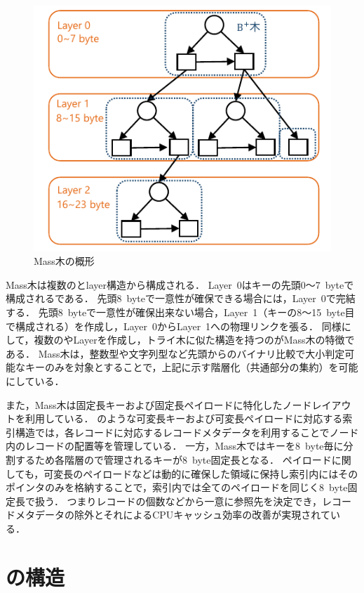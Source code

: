 \begin{figure}[t]
    \centering
    \includegraphics{./figures/masstree.pdf}
    \caption{Mass木の概形}
    \label{fig:masstree}
\end{figure}

Mass木は複数の\Bptree{}とlayer構造から構成される．
Layer~0はキーの先頭0～7~byteで構成される\Bptree{}である．
先頭8~byteで一意性が確保できる場合には，Layer~0で完結する．
先頭8~byteで一意性が確保出来ない場合，Layer~1（キーの8～15~byte目で構成される\Bptree{}）を作成し，Layer~0からLayer~1への物理リンクを張る．
同様にして，複数の\Bptree{}やLayerを作成し，トライ木に似た構造を持つのがMass木の特徴である．
Mass木は，整数型や文字列型など先頭からのバイナリ比較で大小判定可能なキーのみを対象とすることで，上記に示す階層化（共通部分の集約）を可能にしている．

また，Mass木は固定長キーおよび固定長ペイロードに特化したノードレイアウトを利用している．
\Bctree{}のような可変長キーおよび可変長ペイロードに対応する索引構造では，各レコードに対応するレコードメタデータを利用することでノード内のレコードの配置等を管理している．
一方，Mass木ではキーを8~byte毎に分割するため各階層の\Bptree{}で管理されるキーが8~byte固定長となる．
ペイロードに関しても，可変長のペイロードなどは動的に確保した領域に保持し索引内にはそのポインタのみを格納することで，索引内では全てのペイロードを同じく8~byte固定長で扱う．
つまりレコードの個数などから一意に参照先を決定でき，レコードメタデータの除外とそれによるCPUキャッシュ効率の改善が実現されている．

\section{\Bcforest{}の構造}
\label{sec:bc_forest_structure}

